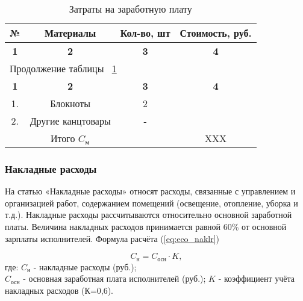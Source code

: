 \begin{center}
\begin{longtable}{|c|c|c|c|}
\caption{Затраты на заработную плату} \label{tab:eco_zatnm} \\ \hline
\multicolumn{1}{|c|}{\textbf{№}} & \multicolumn{1}{c|}{\textbf{Материалы}} & 
\multicolumn{1}{c|}{\textbf{Кол-во, шт}} &   \multicolumn{1}{c|}{\textbf{Стоимость, руб.}} \\ \hline

\multicolumn{1}{|c|}{\textbf{1}} &   \multicolumn{1}{c|}{\textbf{2}} & 
\multicolumn{1}{c|}{\textbf{3}} &   \multicolumn{1}{c|}{\textbf{4}} \\ \hline
\endfirsthead

\multicolumn{4}{|l|}{{Продолжение таблицы ~\ref{tab:eco_zatnm}}} \\ %
\hline
\multicolumn{1}{|c|}{\textbf{1}} &   \multicolumn{1}{c|}{\textbf{2}} & 
\multicolumn{1}{c|}{\textbf{3}} &   \multicolumn{1}{c|}{\textbf{4}} \\ \hline
\endhead

\endfoot

\hline
\endlastfoot

1. & Блокноты & 2 &   \\ \hline
2. & Другие канцтовары & - &  \\ \hline
 & Итого ${C_{\mbox{м}}}$ & & XXX \\

\hline

\end{longtable}
\end{center}

\subsubsection*{Накладные расходы}
На статью «Накладные расходы» относят расходы, связанные с управлением и организацией работ, содержанием помещений
(освещение, отопление, уборка и т.д.). Накладные расходы рассчитываются относительно основной заработной платы. Величина
накладных расходов принимается равной 60\% от основной зарплаты исполнителей. Формула расчёта (\ref{eq:eco_naklr})

\begin{equation}
C_{\mbox{н}} = C_{\mbox{осн}} \cdot K,
\label{eq:eco_naklr}
\end{equation}
где:	${C_{\mbox{н}}}$ - накладные расходы (руб.); \\
	${C_{\mbox{осн}}}$ - основная заработная плата исполнителей (руб.);
	${K}$ - коэффициент учёта накладных расходов (К=0,6).

